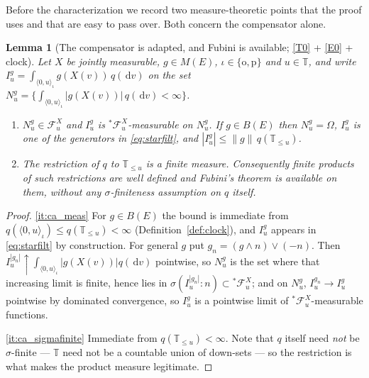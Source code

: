 \documentclass[11pt,a4paper]{article}
\theoremstyle{plain}
\newtheorem{lemma}[theorem]{Lemma}
\theoremstyle{definition}
\theoremstyle{remark}
\newcommand{\T}{\mathbb{T}}                     %
\newcommand{\Meas}{M}                          %
\newcommand{\Bdd}{B}                           %
\newcommand{\Filt}{\mathcal{F}}
\newcommand{\dif}{\,\mathrm{d}}
\begin{document}
Before the characterization we record two measure-theoretic points that the
proof uses and that are easy to pass over.  Both concern the compensator alone.

\begin{lemma}[The compensator is adapted, and Fubini is available; \eqref{T0} + \eqref{E0} + clock]
  \label{lem:compadapted}
  Let $X$ be jointly measurable, $g \in \Meas(E)$, $\iota \in \{\mathrm{o},\mathrm{p}\}$
  and $u \in \T$, and write
  $I^g_u = \int_{\langle 0,u \rangle_\iota} g(X(v))\,q(\dif v)$ on the set
  $N^g_u = \{ \int_{\langle 0,u \rangle_\iota} |g(X(v))| \, q(\dif v) < \infty \}$.
  \begin{enumerate}[label=(\alph*)]
  \item \label{it:ca_meas}
    $N^g_u \in \Filt^X_u$ and $I^g_u$ is ${}^{*}\Filt^X_u$-measurable on $N^g_u$.
    If $g \in \Bdd(E)$ then $N^g_u = \Omega$, $I^g_u$ is one of the generators in
    \eqref{eq:starfilt}, and $|I^g_u| \leq \lVert g \rVert \, q(\T_{\leq u})$.
  \item \label{it:ca_sigmafinite}
    The restriction of $q$ to $\T_{\leq u}$ is a finite measure.  Consequently
    finite products of such restrictions are well defined and Fubini's theorem is
    available on them, without any $\sigma$-finiteness assumption on $q$ itself.
  \end{enumerate}
\end{lemma}

\begin{proof}
  \ref{it:ca_meas}  For $g \in \Bdd(E)$ the bound is immediate from
  $q(\langle 0,u \rangle_\iota) \leq q(\T_{\leq u}) < \infty$
  (Definition~\ref{def:clock}), and $I^g_u$ appears in \eqref{eq:starfilt} by
  construction.  For general $g$ put $g_n = (g \wedge n) \vee (-n)$.  Then
  $I^{|g_n|}_u \uparrow \int_{\langle 0,u\rangle_\iota}|g(X(v))|q(\dif v)$
  pointwise, so $N^g_u$ is the set where that increasing limit is finite, hence
  lies in $\sigma(I^{|g_n|}_u : n) \subset {}^{*}\Filt^X_u$; and on $N^g_u$,
  $I^{g_n}_u \to I^g_u$ pointwise by dominated convergence, so $I^g_u$ is a
  pointwise limit of ${}^{*}\Filt^X_u$-measurable functions.

  \ref{it:ca_sigmafinite}  Immediate from $q(\T_{\leq u}) < \infty$.  Note that
  $q$ itself need \emph{not} be $\sigma$-finite --- $\T$ need not be a countable
  union of down-sets --- so the restriction is what makes the product measure
  legitimate.
\end{proof}
\end{document}

